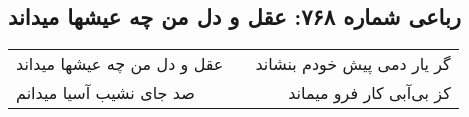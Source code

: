\begin{center}
\section*{رباعی شماره ۷۶۸: عقل و دل من چه عیشها میداند}
\label{sec:0768}
\begin{longtable}{l p{0.5cm} r}
عقل و دل من چه عیشها میداند
&&
گر یار دمی پیش خودم بنشاند
\\
صد جای نشیب آسیا میدانم
&&
کز بی‌آبی کار فرو میماند
\\
\end{longtable}
\end{center}
